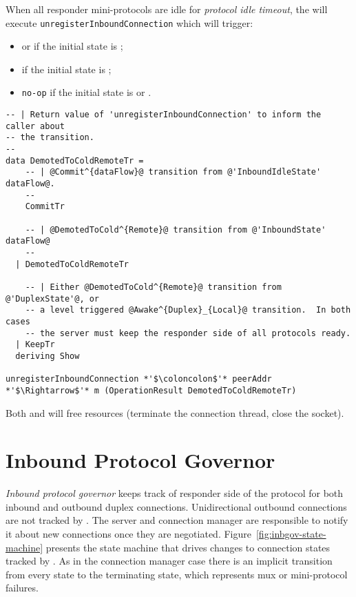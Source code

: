 When all responder mini-protocols are idle for \textit{protocol idle timeout},
the \inbgov{} will execute \texttt{unregisterInboundConnection} which will trigger:
\begin{itemize}
  \item \CommitUniRem{} or \CommitDupRem{} if the initial state is
    \InboundIdleStateDup{};
  \item \TimeoutExpired{}  if the initial state is \OutboundStateDupTau{};
  \item \texttt{no-op}  if the initial state is \OutboundStateDup{} or \OutboundIdleStateAny{}.
\end{itemize}

\begin{lstlisting}
-- | Return value of 'unregisterInboundConnection' to inform the caller about
-- the transition.
--
data DemotedToColdRemoteTr =
    -- | @Commit^{dataFlow}@ transition from @'InboundIdleState' dataFlow@.
    --
    CommitTr

    -- | @DemotedToCold^{Remote}@ transition from @'InboundState' dataFlow@
    --
  | DemotedToColdRemoteTr

    -- | Either @DemotedToCold^{Remote}@ transition from @'DuplexState'@, or
    -- a level triggered @Awake^{Duplex}_{Local}@ transition.  In both cases
    -- the server must keep the responder side of all protocols ready.
  | KeepTr
  deriving Show

unregisterInboundConnection *'$\coloncolon$'* peerAddr *'$\Rightarrow$'* m (OperationResult DemotedToColdRemoteTr)
\end{lstlisting}
Both \CommitUniRem{} and \CommitDupRem{} will free resources (terminate the
connection thread, close the socket).


\section{Inbound Protocol Governor}
\textit{Inbound protocol governor} keeps track of responder side of the protocol for
both inbound and outbound duplex connections.  Unidirectional outbound
connections are not tracked by \inbgov{}.  The server and connection manager
are responsible to notify it about new connections once they are negotiated.
Figure~\ref{fig:inbgov-state-machine} presents the state machine that drives
changes to connection states tracked by \inbgov{}.  As in the connection
manager case there is an implicit transition from every state to the
terminating state, which represents mux or mini-protocol failures.

